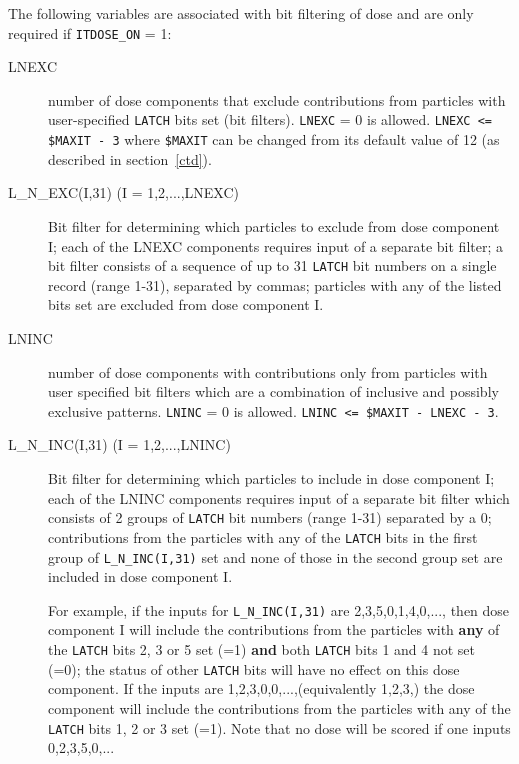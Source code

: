 \documentclass[12pt,twoside]{article}
\begin{document}
The following variables are associated with bit filtering of dose and
are only required if \verb+ITDOSE_ON+ = 1:
\begin{description}
\item [LNEXC] number of dose components that
exclude contributions from particles with user-specified \verb+LATCH+ bits
set (bit filters). \verb+LNEXC+ = 0 is allowed. \verb+LNEXC <= $MAXIT - 3+
where \verb+$MAXIT+ can be changed from its default value of 12
(as described in section~\ref{ctd}).
\item [L\_N\_EXC(I,31) (I = 1,2,...,LNEXC)] Bit filter for determining
which particles to exclude
from dose component I; each of the LNEXC components requires input of a
separate bit filter; a bit filter consists of a sequence of up to 31
\verb+LATCH+
bit numbers on a single record (range 1-31), separated by commas;
particles with any of the listed bits  set
are excluded from dose component I.
\item [LNINC] number of dose components with contributions only from
particles with user specified bit filters which are a combination of
inclusive and possibly exclusive patterns.  \verb+LNINC+ = 0 is allowed.
\verb+LNINC <= $MAXIT - LNEXC - 3+.

\item [L\_N\_INC(I,31) (I = 1,2,...,LNINC)] Bit filter for determining
which particles to include in dose component I; each of the LNINC
components requires input of a separate bit filter which consists of 2 groups
of \verb+LATCH+ bit numbers (range 1-31) separated by a 0;
contributions from the particles with any of the \verb+LATCH+ bits in the
first group of \verb+L_N_INC(I,31)+ set and none of those in the second
group set are included in dose component I.

For example, if the inputs for
\verb+L_N_INC(I,31)+ are 2,3,5,0,1,4,0,..., then dose component I will
include the contributions from the particles with {\bf any} of the \verb+LATCH+
bits 2, 3 or 5 set (=1) {\bf and} both \verb+LATCH+ bits 1 and 4 not set (=0);
the status of other \verb+LATCH+ bits will have no effect on this
dose component.
If the inputs are 1,2,3,0,0,...,(equivalently 1,2,3,)
the dose component  will include
the contributions from the particles with any of the \verb+LATCH+
bits 1, 2 or 3
set (=1). Note that no dose will be scored if one inputs 0,2,3,5,0,...


\end{description}
\end{document}

